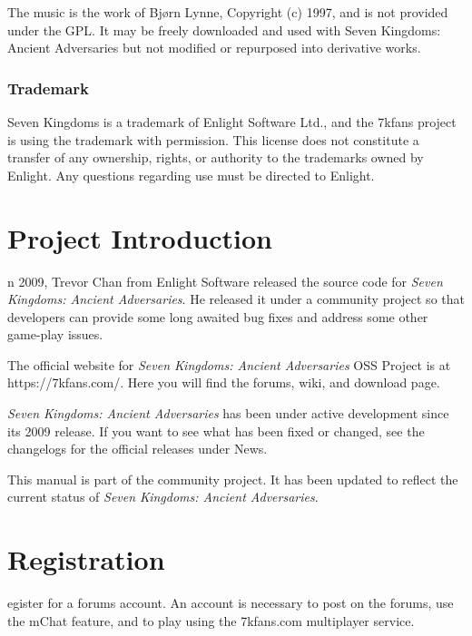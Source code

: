 \documentclass[openany]{book}
\begin{document}

The music is the work of Bjørn Lynne, Copyright (c) 1997, and is not provided under the GPL. It may be freely downloaded and used with Seven Kingdoms: Ancient Adversaries but not modified or repurposed into derivative works.

\subsubsection{Trademark}

Seven Kingdoms is a trademark of Enlight Software Ltd., and the 7kfans project is using the trademark with permission. This license does not constitute a transfer of any ownership, rights, or authority to the trademarks owned by Enlight. Any questions regarding use must be directed to Enlight.

\clearpage

\section{Project Introduction}


n 2009, Trevor Chan from Enlight Software released the source code for \textit{Seven Kingdoms: Ancient Adversaries}. He released it under a community project so that developers can provide some long awaited bug fixes and address some other game-play issues. 

The official website for \textit{Seven Kingdoms: Ancient Adversaries} OSS Project is at https://7kfans.com/. Here you will find the forums, wiki, and download page.

\textit{Seven Kingdoms: Ancient Adversaries} has been under active development since its 2009 release. If you want to see what has been fixed or changed, see the changelogs for the official releases under News. 

This manual is part of the community project. It has been updated to reflect the current status of \textit{Seven Kingdoms: Ancient Adversaries}.

\section{Registration}


egister for a forums account. An account is necessary to post on the forums, use the mChat feature, and to play using the 7kfans.com multiplayer service.
\end{document}
